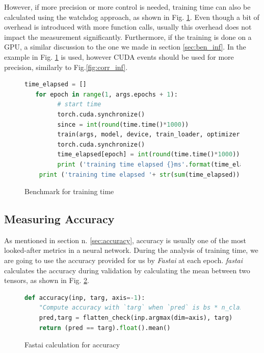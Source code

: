 However, if more precision or more control is needed, training time can also be calculated using the watchdog approach, as shown in Fig. \ref{fig:ben_tra}. Even though a bit of overhead is introduced with more function calls, usually this overhead does not impact the measurement significantly. Furthermore, if the training is done on a GPU, a similar discussion to the one we made in section \ref{sec:ben_inf}. In the example in Fig. \ref{fig:ben_tra} is used, however CUDA events should be used for more precision, similarly to Fig.\ref{fig:corr_inf}. 
\begin{figure}[h]
\begin{lstlisting}[language=python]
   time_elapsed = []
   for epoch in range(1, args.epochs + 1):
         # start time
         torch.cuda.synchronize()
         since = int(round(time.time()*1000))
         train(args, model, device, train_loader, optimizer, epoch)
         torch.cuda.synchronize()
         time_elapsed[epoch] = int(round(time.time()*1000)) - since
         print ('training time elapsed {}ms'.format(time_elapsed[epoch]))
    print ('training time elapsed '+ str(sum(time_elapsed)) + 'ms')
\end{lstlisting}
\caption{Benchmark for training time}
\label{fig:ben_tra}
\end{figure}




\subsection{Measuring Accuracy}
As mentioned in section n. \ref{sec:accuracy}, accuracy is usually one of the most looked-after metrics in a neural network. 
During the analysis of training time, we are going to use the accuracy provided for us by \textit{Fastai} at each epoch. \textit{fastai} calculates the accuracy during validation by calculating the mean between two tensors, as shown in Fig. \ref{fig:fast_acc}. \cite{fastaidocs}
\begin{figure}[h]
\begin{lstlisting}[language=python]
def accuracy(inp, targ, axis=-1):
    "Compute accuracy with `targ` when `pred` is bs * n_classes"
    pred,targ = flatten_check(inp.argmax(dim=axis), targ)
    return (pred == targ).float().mean()
\end{lstlisting}
\caption{Fastai calculation for accuracy \cite{fastaidocs}}
\label{fig:fast_acc}
\end{figure}














